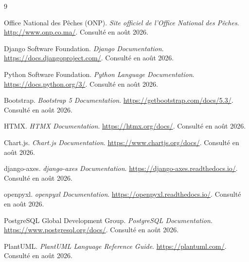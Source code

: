\begin{thebibliography}{9}

Office National des Pêches (ONP).
\textit{Site officiel de l'Office National des Pêches}.
\url{http://www.onp.co.ma/}. Consulté en août 2026.

Django Software Foundation.
\textit{Django Documentation}.
\url{https://docs.djangoproject.com/}. Consulté en août 2026.

Python Software Foundation.
\textit{Python Language Documentation}.
\url{https://docs.python.org/3/}. Consulté en août 2026.

Bootstrap.
\textit{Bootstrap 5 Documentation}.
\url{https://getbootstrap.com/docs/5.3/}. Consulté en août 2026.

HTMX.
\textit{HTMX Documentation}.
\url{https://htmx.org/docs/}. Consulté en août 2026.

Chart.js.
\textit{Chart.js Documentation}.
\url{https://www.chartjs.org/docs/}. Consulté en août 2026.

django-axes.
\textit{django-axes Documentation}.
\url{https://django-axes.readthedocs.io/}. Consulté en août 2026.

openpyxl.
\textit{openpyxl Documentation}.
\url{https://openpyxl.readthedocs.io/}. Consulté en août 2026.

PostgreSQL Global Development Group.
\textit{PostgreSQL Documentation}.
\url{https://www.postgresql.org/docs/}. Consulté en août 2026.

PlantUML.
\textit{PlantUML Language Reference Guide}.
\url{https://plantuml.com/}. Consulté en août 2026.

\end{thebibliography}

